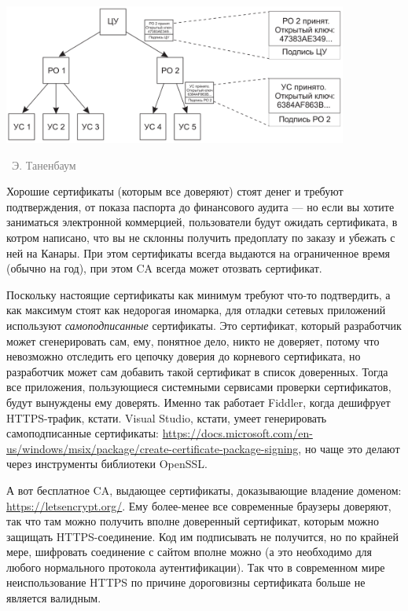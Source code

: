 \documentclass[a5paper]{article}
\newcommand{\attribution}[1] {
\vspace{-5mm}\begin{flushright}\begin{scriptsize}\textcolor{gray}{\textcopyright\, #1}\end{scriptsize}\end{flushright}
}
\begin{document}
\begin{center}
    \includegraphics[width=0.85\textwidth]{certHierarchy.png}
    \attribution{Э. Таненбаум}
\end{center}

Хорошие сертификаты (которым все доверяют) стоят денег и требуют подтверждения, от показа паспорта до финансового аудита --- но если вы хотите заниматься электронной коммерцией, пользователи будут ожидать сертификата, в котром написано, что вы не склонны получить предоплату по заказу и убежать с ней на Канары. При этом сертификаты всегда выдаются на ограниченное время (обычно на год), при этом CA всегда может отозвать сертификат.

Поскольку настоящие сертификаты как минимум требуют что-то подтвердить, а как максимум стоят как недорогая иномарка, для отладки сетевых приложений используют \textit{самоподписанные} сертификаты. Это сертификат, который разработчик может сгенерировать сам, ему, понятное дело, никто не доверяет, потому что невозможно отследить его цепочку доверия до корневого сертификата, но разработчик может сам добавить такой сертификат в список доверенных. Тогда все приложения, пользующиеся системными сервисами проверки сертификатов, будут вынуждены ему доверять. Именно так работает Fiddler, когда дешифрует HTTPS-трафик, кстати. Visual Studio, кстати, умеет генерировать самоподписанные сертификаты: \url{https://docs.microsoft.com/en-us/windows/msix/package/create-certificate-package-signing}, но чаще это делают через инструменты библиотеки OpenSSL. 

А вот бесплатное CA, выдающее сертификаты, доказывающие владение доменом: \url{https://letsencrypt.org/}. Ему более-менее все современные браузеры доверяют, так что там можно получить вполне доверенный сертификат, которым можно защищать HTTPS-соединение. Код им подписывать не получится, но по крайней мере, шифровать соединение с сайтом вполне можно (а это необходимо для любого нормального протокола аутентификации). Так что в современном мире неиспользование HTTPS по причине дороговизны сертификата больше не является валидным.
\end{document}
